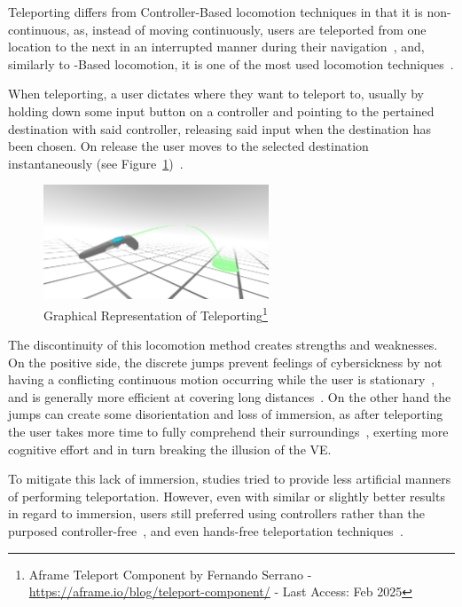 Teleporting differs from Controller-Based locomotion techniques in that it is non-continuous, as, 
instead of moving continuously, users are teleported from one location to the next in an interrupted manner during their navigation~\cite{Boletsis2017}, 
and, similarly to -Based locomotion, it is one of the most used locomotion techniques~\cite{Boletsis2022}.

When teleporting, a user dictates where they want to teleport to, usually by holding down some input button on a controller and pointing to
the pertained destination with said controller, releasing said input when the destination has been chosen. On release the user 
moves to the selected destination instantaneously (see Figure~\ref{fig:teleporting})~\cite{Coomer2018, Nasiri2023}.

\begin{figure}[b]
    \centering
    \includegraphics[width=0.6\textwidth]{NOVAthesisFiles/Images/papers/teleporting.png}
    \caption[Graphical Representation of Teleporting]{Graphical Representation of Teleporting\footnote{Aframe Teleport Component by Fernando Serrano - \href{https://aframe.io/blog/teleport-component/}{https://aframe.io/blog/teleport-component/} - Last Access: Feb 2025 } 
    }
    \label{fig:teleporting}
\end{figure}

The discontinuity of this locomotion method creates strengths and weaknesses. On the positive side, the discrete jumps prevent feelings of
cybersickness by not having a conflicting continuous motion occurring while the user is stationary~\cite{Boletsis2019, Nasiri2023}, 
and is generally more efficient at covering long distances~\cite{Coomer2018}. On the other hand the jumps can create some disorientation and
loss of immersion, as after teleporting the user takes more time to fully comprehend their surroundings~\cite{Langbehn2018}, exerting more
cognitive effort and in turn breaking the illusion of the \gls{VE}.

To mitigate this lack of immersion, studies tried to provide less artificial manners of performing teleportation. However, even with similar or 
slightly better results in regard to immersion, users still preferred using controllers rather than the purposed controller-free~\cite{Bozgeyikli2016}, 
and even hands-free teleportation techniques~\cite{Prithul2022}.

